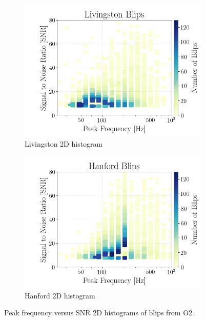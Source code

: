 \documentclass[a4paper]{article}
\begin{document}
\begin{figure}[h!]
	\centering
	\begin{subfigure}{.49\textwidth}
		\centering
		\includegraphics[width=1\linewidth]{llo_2d}
		\caption{Livingston 2D histogram}
		\label{fig:llo_2d}
	\end{subfigure}
	\begin{subfigure}{.49\textwidth}
		\centering
		\includegraphics[width=1\linewidth]{lho_2d}
		\caption{Hanford 2D histogram}
		\label{fig:lho_2d}
	\end{subfigure}
	\caption{Peak frequency versus SNR 2D histograms of blips from O2.}
	\label{fig:hists_2d}
\end{figure}
\end{document}
